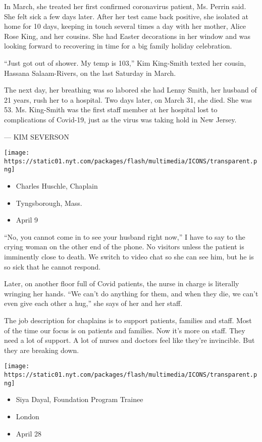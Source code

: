 In March, she treated her first confirmed coronavirus patient, Ms.
Perrin said. She felt sick a few days later. After her test came back
positive, she isolated at home for 10 days, keeping in touch several
times a day with her mother, Alice Rose King, and her cousins. She had
Easter decorations in her window and was looking forward to recovering
in time for a big family holiday celebration.

``Just got out of shower. My temp is 103,'' Kim King-Smith texted her
cousin, Hassana Salaam-Rivers, on the last Saturday in March.

The next day, her breathing was so labored she had Lenny Smith, her
husband of 21 years, rush her to a hospital. Two days later, on March
31, she died. She was 53. Ms. King-Smith was the first staff member at
her hospital lost to complications of Covid-19, just as the virus was
taking hold in New Jersey.

--- KIM SEVERSON

\texttt{[image: https://static01.nyt.com/packages/flash/multimedia/ICONS/transparent.png]}

\begin{itemize}
\tightlist
\item
  Charles Huschle, Chaplain
\item
  Tyngsborough, Mass.
\item
  April 9
\end{itemize}

``No, you cannot come in to see your husband right now,'' I have to say
to the crying woman on the other end of the phone. No visitors unless
the patient is imminently close to death. We switch to video chat so she
can see him, but he is so sick that he cannot respond.

Later, on another floor full of Covid patients, the nurse in charge is
literally wringing her hands. ``We can't do anything for them, and when
they die, we can't even give each other a hug,'' she says of her and her
staff.

The job description for chaplains is to support patients, families and
staff. Most of the time our focus is on patients and families. Now it's
more on staff. They need a lot of support. A lot of nurses and doctors
feel like they're invincible. But they are breaking down.

\texttt{[image: https://static01.nyt.com/packages/flash/multimedia/ICONS/transparent.png]}

\begin{itemize}
\tightlist
\item
  Siya Dayal, Foundation Program Trainee
\item
  London
\item
  April 28
\end{itemize}

